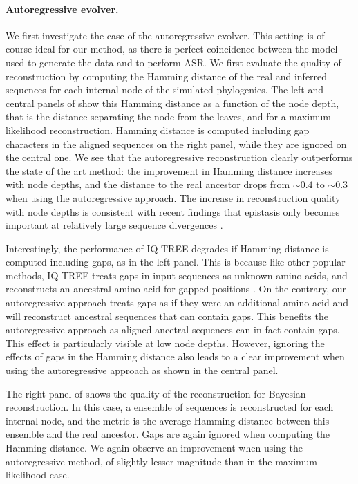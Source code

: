 \paragraph*{Autoregressive evolver.} We first investigate the case of the autoregressive evolver. 
This setting is of course ideal for our method, as there is perfect coincidence between the model used to generate the data and to perform ASR. 
We first evaluate the quality of reconstruction by computing the Hamming distance of the real and inferred sequences for each internal node of the simulated phylogenies. 
The left and central panels of  show this Hamming distance as a function of the node depth, that is the distance separating the node from the leaves, and for a maximum likelihood reconstruction. 
Hamming distance is computed including gap characters in the aligned sequences on the right panel, while they are ignored on the central one. 
We see that the autoregressive reconstruction clearly outperforms the state of the art method: the improvement in Hamming distance increases with node depths, and the distance to the real ancestor drops from $\sim 0.4$ to $\sim 0.3$ when using the autoregressive approach. 
The increase in reconstruction quality with node depths is consistent with recent findings that epistasis only becomes important at relatively large sequence divergences \cite{park_epistaticdriftcauses_2022,bari_emergenttimescales_2024}.

Interestingly, the performance of IQ-TREE degrades if Hamming distance is computed including gaps, as in the left panel. 
This is because like other popular methods, IQ-TREE treats gaps in input sequences as unknown amino acids, and reconstructs an ancestral amino acid for gapped positions \cite{yang_pamlphylogeneticanalysis_2007,minh_iqtreenewmodels_2020}. 
On the contrary, our autoregressive approach treats gaps as if they were an additional amino acid and will reconstruct ancestral sequences that can contain gaps. 
This benefits the autoregressive approach as aligned ancetral sequences can in fact contain gaps.
This effect is particularly visible at low node depths. 
However, ignoring the effects of gaps in the Hamming distance also leads to a clear improvement when using the autoregressive approach as shown in the central panel. 

The right panel of  shows the quality of the reconstruction for Bayesian reconstruction. 
In this case, a ensemble of sequences is reconstructed for each internal node, and the metric is the average Hamming distance between this ensemble and the real ancestor. 
Gaps are again ignored when computing the Hamming distance. 
We again observe an improvement when using the autoregressive method, of slightly lesser magnitude than in the maximum likelihood case. \\


